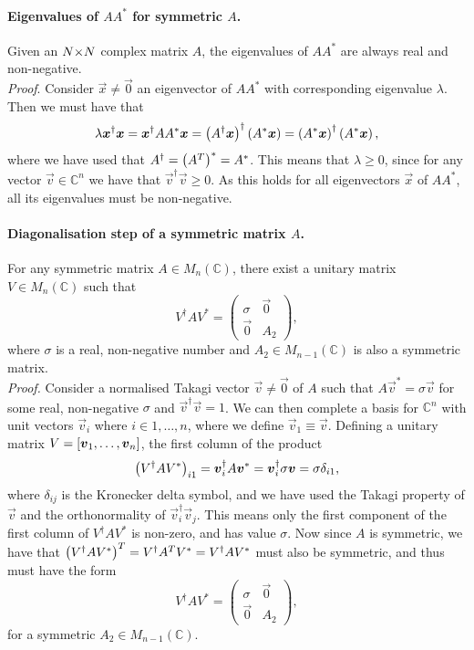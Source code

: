 \documentclass[../main.tex]{subfiles}
\begin{document}
\paragraph{Eigenvalues of \(AA^\ast\) for symmetric \(A\).}
Given an \(N {\times} N\) complex matrix \(A\), the eigenvalues of \(AA^\ast\) are always real and non-negative.\\
\emph{Proof}.
Consider \(\vec{x} \neq \vec{0}\) an eigenvector of \(AA^\ast\) with corresponding eigenvalue \(\lambda\).
Then we must have that
\[\lambda \boldsymbol{x}^\dagger \boldsymbol{x} = \boldsymbol{x}^\dagger AA^\ast \boldsymbol{x} = \left(A^\dagger \boldsymbol{x}\right)^\dagger \left(A^\ast \boldsymbol{x}\right) = \left(A^\ast \boldsymbol{x}\right)^\dagger \left(A^\ast \boldsymbol{x}\right),\]
where we have used that \(A^\dagger = \left(A^T\right)^\ast = A^\ast\).
This means that \(\lambda \geq 0\), since for any vector \(\vec{v} \in \mathbb{C}^n\) we have that \(\vec{v}^\dagger \vec{v} \geq 0\).
As this holds for all eigenvectors \(\vec{x}\) of \(AA^\ast\), all its eigenvalues must be non-negative.

\paragraph{Diagonalisation step of a symmetric matrix \(A\).}
For any symmetric matrix \(A \in M_n(\mathbb{C})\), there exist a unitary matrix \(V \in M_n(\mathbb{C})\) such that
\[V^\dagger A V^\ast = \begin{pmatrix} \sigma & \vec{0} \\ \vec{0} & A_2 \end{pmatrix},\]
where \(\sigma\) is a real, non-negative number and \(A_2 \in M_{n-1}(\mathbb{C})\) is also a symmetric matrix. \\
\emph{Proof.}
Consider a normalised Takagi vector \(\vec{v} \neq \vec{0}\) of \(A\) such that \(A\vec{v}^\ast = \sigma \vec{v}\) for some real, non-negative \(\sigma\) and \(\vec{v}^\dagger \vec{v} = 1\).
We can then complete a basis for \(\mathbb{C}^n\) with unit vectors \(\vec{v}_i\) where \(i \in 1, \ldots, n\), where we define \(\vec{v}_1 \equiv \vec{v}\).
Defining a unitary matrix \(V = \left[\boldsymbol{v}_1, \ldots, \boldsymbol{v}_{n}\right]\), the first column of the product
\[\left(V^\dagger A V^\ast\right)_{i1} = \boldsymbol{v}_i^\dagger A \boldsymbol{v}^* = \boldsymbol{v}_i^\dagger \sigma \boldsymbol{v} = \sigma \delta_{i1},\]
where \(\delta_{ij}\) is the Kronecker delta symbol, and we have used the Takagi property of \(\vec{v}\) and the orthonormality of \(\vec{v}_i^\dagger \vec{v}_j\).
This means only the first component of the first column of \(V^\dagger A V^\ast\) is non-zero, and has value \(\sigma\).
Now since \(A\) is symmetric, we have that
\(\left(V^\dagger A V^\ast\right)^T = V^\dagger A^T V^\ast = V^\dagger A V^\ast\)
must also be symmetric, and thus must have the form
\[V^\dagger A V^\ast = \begin{pmatrix} \sigma & \vec{0} \\ \vec{0} & A_2 \end{pmatrix},\]
for a symmetric \(A_2 \in M_{n-1}(\mathbb{C})\).


% 
\end{document}
